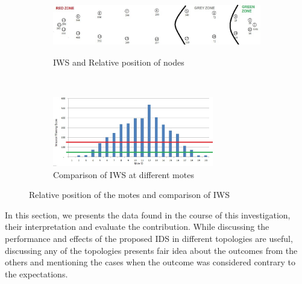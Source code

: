 \documentclass[conference,manuscript]{IEEEtran}
\newcommand{\notedme}[1]{\raisebox{0pt}[0pt][0pt]{\pdfcomment[open=true,color=blue]{#1}}}
\begin{document}
\begin{figure}[t!]
    \centering
    \begin{subfigure}[b]{0.5\textwidth}
        \centering
        \includegraphics[height=1in, width=4in]{Elliptical}
        \caption{IWS and Relative position of nodes}
        \label{subfig:elliptopo} %
    \end{subfigure}%
    ~ 
    \begin{subfigure}[b]{0.5\textwidth}
        \centering
        \includegraphics[height=1.2in]{Elliptical_column}
        \caption{Comparison of IWS at different motes}
        \label{subfig:ellipgraph} %
    \end{subfigure}
    \caption{Relative position of the motes and comparison of IWS }
    \label{fig:ellip} %
\end{figure}

In this section, we presents the data found in the course of this investigation, their interpretation and evaluate the contribution.
While discussing the performance and effects of the proposed IDS in different topologies are useful, discussing any of the topologies presents fair idea about the outcomes from the others and mentioning the cases when the outcome was considered  contrary to the expectations.


\end{document}
